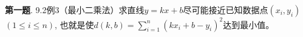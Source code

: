 \usepackage{relsize}

\renewcommand{\newpageorvspace}{\vspace{2em}}

\date{2022-5-20  第六次习题课}



\maketitle




{\bf 第一题}. 9.2例3（最小二乘法）求直线$y = kx + b$尽可能接近已知数据点$(x_i, y_i)$ $(1 \leqslant i \leqslant n)$, 也就是使$d(k, b) = \sum\limits_{i=1}^n (kx_i + b - y_i)^2$达到最小值。


